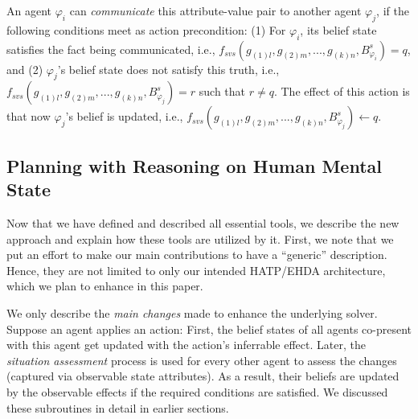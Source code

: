 \documentclass[letterpaper]{article} %
\begin{document}
An agent $\varphi_i$ can \textit{communicate} this attribute-value pair to another agent $\varphi_j$, if the following conditions meet as action precondition: 
(1) For $\varphi_i$, its belief state satisfies the fact being communicated, i.e.,
$f_{\textit{svs}}(g_{(1)l},g_{(2)m},...,g_{(k)n},B_{\varphi_i}^s) = q$, and (2) $\varphi_j$'s belief state does not satisfy this truth, i.e., $f_{\textit{svs}}(g_{(1)l},g_{(2)m},...,g_{(k)n},B_{\varphi_j}^s) = r$ such that $r \neq q$.
The effect of this action is that now 
$\varphi_j$'s belief is updated, i.e., $f_{\textit{svs}}(g_{(1)l},g_{(2)m},...,g_{(k)n},B_{\varphi_j}^s) \leftarrow q$. 

% 



\subsection{Planning with Reasoning on Human Mental State }
Now that we have defined and described all essential tools, we describe the new approach and explain how these tools are utilized by it. 
First, we note that we put an effort to make our main contributions to have a ``generic'' description. Hence, they are not limited to only our intended HATP/EHDA architecture, which we plan to enhance in this paper.

We only describe the \textit{main changes} made to enhance the underlying solver. 
Suppose an agent applies an action: First, the belief states of all agents co-present with this agent get updated with the action's inferrable effect. Later, the \textit{situation assessment} process is used for every other agent to assess the changes (captured via observable state attributes). As a result, their beliefs are updated by the observable effects if the required conditions are satisfied. We discussed these subroutines in detail in earlier sections.
\end{document}
